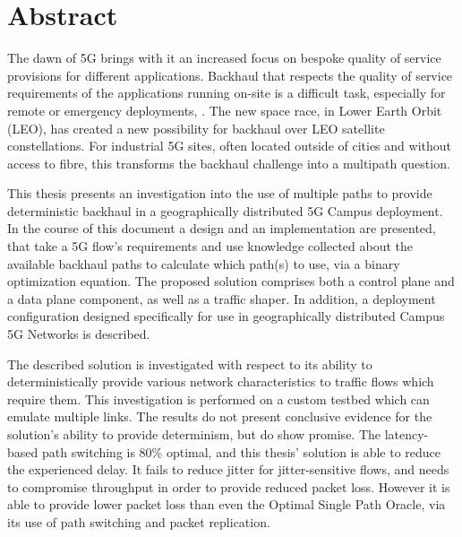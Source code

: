 
\cleardoublepage
{}
\section*{Abstract}

The dawn of 5G brings with it an increased focus on bespoke quality of service provisions for different applications. Backhaul that respects the quality of service requirements of the applications running on-site is a difficult task, especially for remote or emergency deployments, . The new space race, in Lower Earth Orbit (LEO), has created a new possibility for backhaul over LEO satellite constellations. For industrial 5G sites, often located outside of cities and without access to fibre, this transforms the backhaul challenge into a multipath question.

This thesis presents an investigation into the use of multiple paths to provide deterministic backhaul in a geographically distributed 5G Campus deployment. In the course of this document a design and an implementation are presented, that take a 5G flow's requirements and use knowledge collected about the available backhaul paths to calculate which path(s) to use, via a binary optimization equation. The proposed solution comprises both a control plane and a data plane component, as well as a traffic shaper. In addition, a deployment configuration designed specifically for use in geographically distributed Campus 5G Networks is described.

The described solution is investigated with respect to its ability to deterministically provide various network characteristics to traffic flows which require them. This investigation is performed on a custom testbed which can emulate multiple links. The results do not present conclusive evidence for the solution's ability to provide determinism, but do show promise. The latency-based path switching is 80\% optimal, and this thesis' solution is able to reduce the experienced delay. It fails to reduce jitter for jitter-sensitive flows, and needs to compromise throughput in order to provide reduced packet loss. However it is able to provide lower packet loss than even the Optimal Single Path Oracle, via its use of path switching and packet replication.


\cleardoublepage
{}
